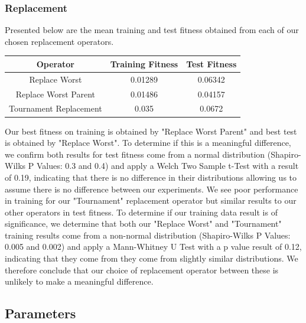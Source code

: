 \documentclass[sigconf]{acmart}
\begin{document}
\subsubsection{Replacement}
Presented below are the mean training and test fitness obtained from each of our chosen replacement operators.


\begin{center}
\begin{tabular} {|c|c|c|}
\hline
Operator & Training Fitness & Test Fitness \\
\hline
Replace Worst & 0.01289 & 0.06342 \\
Replace Worst Parent & 0.01486 & 0.04157 \\
Tournament Replacement & 0.035 & 0.0672 \\

\hline

\end{tabular}
\end{center}
Our best fitness on training is obtained by "Replace Worst Parent" and best test is obtained by "Replace Worst".  To determine if this is a meaningful difference, we confirm both results for test fitness come from a normal distribution (Shapiro-Wilks P Values: 0.3 and 0.4) and apply a Welch Two Sample t-Test with a result of 0.19, indicating that there is no difference in their distributions allowing us to assume there is no difference between our experiments.
We see poor performance in training for our "Tournament" replacement operator but similar results to our other operators in test fitness. To determine if our training data result is of significance, we determine that both our "Replace Worst" and "Tournament" training results come from a non-normal distribution (Shapiro-Wilks P Values: 0.005 and 0.002) and apply a Mann-Whitney U Test with a p value result of 0.12, indicating that they come from they come from slightly similar distributions. We therefore conclude that our choice of replacement operator between these is unlikely to make a meaningful difference.


\subsection{Parameters}
\end{document}
